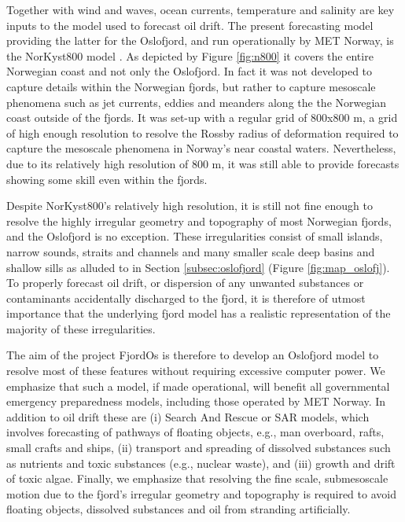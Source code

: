 Together with wind and waves, ocean currents, temperature and salinity are key inputs to the model used to forecast oil drift. The present forecasting model providing the latter for the Oslofjord, and run operationally by MET Norway, is the NorKyst800 model \citep{albre:etal:2011}. As depicted by Figure \ref{fig:n800} it covers the entire Norwegian coast and not only the Oslofjord. In fact it was not developed to capture details within the Norwegian fjords, but rather to capture mesoscale phenomena such as jet currents, eddies and meanders along the the Norwegian coast outside of the fjords. It was set-up with a regular grid of 800x800 m, a grid of high enough resolution to resolve the Rossby radius of deformation required to capture the mesoscale phenomena in Norway's near coastal waters. Nevertheless, due to its relatively high resolution of 800 m, it was still able to provide forecasts showing some skill even within the fjords.


Despite NorKyst800's relatively high resolution, it is still not fine enough to resolve the highly irregular geometry and topography of most Norwegian fjords, and the Oslofjord is no exception. These irregularities consist of small islands, narrow sounds, straits and channels and many smaller scale deep basins and shallow sills as alluded to in Section \ref{subsec:oslofjord} (Figure \ref{fig:map_oslofj}). To properly forecast oil drift, or dispersion of any unwanted substances or contaminants accidentally discharged to the fjord, it is therefore of utmost importance that the underlying fjord model has a realistic representation of the majority of these irregularities. 

The aim of the project FjordOs is therefore to develop an Oslofjord model to resolve most of these features without requiring excessive computer power. We emphasize that such a model, if made operational, will benefit all governmental emergency preparedness models, including those operated by MET Norway. In addition to oil drift these are (i) Search And Rescue or SAR models, which involves forecasting of pathways of floating objects, e.g., man overboard, rafts, small crafts and ships, (ii) transport and spreading of dissolved substances such as nutrients and toxic substances (e.g., nuclear waste), and (iii) growth and drift of toxic algae. Finally, we emphasize that resolving the fine scale, submesoscale motion due to the fjord's irregular geometry and topography is required to avoid floating objects, dissolved substances and oil from stranding artificially.  

